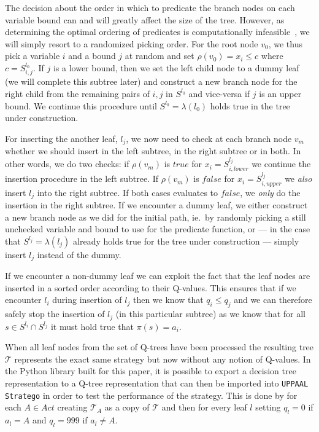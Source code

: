 The decision about the order in which to predicate the branch nodes on each
variable bound can and will greatly affect the size of the tree. However, as
determining the optimal ordering of predicates is computationally
infeasible~\cite{HYAFIL197615}, we will simply resort to a randomized picking
order.  For the root node $v_0$, we thus pick a variable $i$ and a bound $j$ at
random and set $\rho(v_0) = x_i \le c$ where $c = S^{l_0}_{i,j}$. If $j$ is a
lower bound, then we set the left child node to a dummy leaf (we will complete
this subtree later) and construct a new branch node for the right child from the
remaining pairs of $i, j$ in $S^{l_0}$ and vice-versa if $j$ is an upper bound.
We continue this procedure until $S^{l_0} = \lambda(l_0)$ holds true in the tree
under construction.

For inserting the another leaf, $l_j$, we now need to check at each branch node
$v_m$ whether we should insert in the left subtree, in the right subtree or in
both.  In other words, we do two checks: if $\rho(v_m)$ is $true$ for $x_i =
S^{l_j}_{i,lower}$ we continue the insertion procedure in the left subtree.  If
$\rho(v_m)$ is $false$ for $x_i = S^{l_j}_{i, upper}$ we \textit{also} insert
$l_j$ into the right subtree. If both cases evaluates to $false$, we
\textit{only} do the insertion in the right subtree. If we encounter a dummy
leaf, we either construct a new branch node as we did for the initial path, ie.\ by
randomly picking a still unchecked variable and bound to use for the predicate
function, or --- in the case that $S^{l_j} = \lambda(l_j)$ already holds true
for the tree under construction --- simply insert $l_j$ instead of the dummy.

If we encounter a non-dummy leaf we can exploit the fact that the leaf nodes are
inserted in a sorted order according to their Q-values. This ensures that if we
encounter $l_i$ during insertion of $l_j$ then we know that $q_i \le  q_j$ and
we can therefore safely stop the insertion of $l_j$ (in this particular subtree)
as we know that for all $s \in S^{l_i} \cap S^{l_j}$ it must hold true that
$\pi(s) = a_i$.

When all leaf nodes from the set of Q-trees have been processed the resulting
tree $\mathcal{T}$ represents the exact same strategy but now without any notion
of Q-values. In the Python library built for this paper, it is possible to
export a decision tree representation to a Q-tree representation that can then
be imported into \texttt{UPPAAL Stratego} in order to test the performance of
the strategy. This is done by for each $A \in Act$ creating
$\mathcal{T}_A$ as a copy of $\mathcal{T}$ and then for every leaf $l$ setting
$q_l = 0$ if $a_l = A$ and $q_l = 999$ if $a_l \neq A$.

